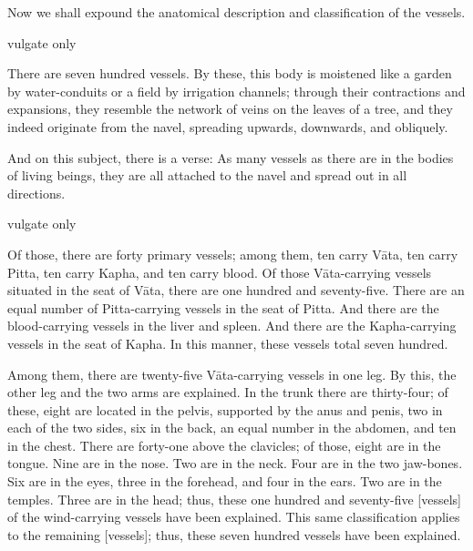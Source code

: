 \begin{translation}
    
    
    \bigskip       
    
    \begin{tt}
        \raggedright
        \bigskip
        
\item[1]

Now we shall expound the anatomical description and classification of the vessels.

\item[2]  vulgate only

\item[3]
There are seven hundred vessels.
By these, this body is moistened like a garden by water-conduits or a field by irrigation channels; through their contractions and expansions, they resemble the network of veins on the leaves of a tree, and they indeed originate from the navel, spreading upwards, downwards, and obliquely.

\item[4]
And on this subject, there is a verse:
As many vessels as there are in the bodies of living beings, they are all attached to the navel and spread out in all directions.

\item[5]   vulgate only

\item[6]
Of those, there are forty primary vessels; among them, ten carry Vāta, ten carry Pitta, ten carry Kapha, and ten carry blood.
Of those Vāta-carrying vessels situated in the seat of Vāta, there are one hundred and seventy-five.
There are an equal number of Pitta-carrying vessels in the seat of Pitta.
And there are the blood-carrying vessels in the liver and spleen.
And there are the Kapha-carrying vessels in the seat of Kapha.
In this manner, these vessels total seven hundred. 

\item[7]
Among them, there are twenty-five Vāta-carrying vessels in one leg.
By this, the other leg and the two arms are explained.
In the trunk there are thirty-four; of these, eight are located in the pelvis, supported by the anus and penis, two in each of the two sides, six in the back, an equal number in the abdomen, and ten in the chest.
There are forty-one above the clavicles; of those, eight are in the tongue.
Nine are in the nose.
Two are in the neck.
Four are in the two jaw-bones.
Six are in the eyes, three in the forehead, and four in the ears.
Two are in the temples.
Three are in the head; thus, these one hundred and seventy-five [vessels] of the wind-carrying vessels have been explained.
This same classification applies to the remaining [vessels]; thus, these seven hundred vessels have been explained.


\end{tt}
\end{translation}
